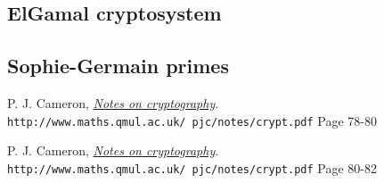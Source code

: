 \documentclass[12pt]{article}
\begin{document}
	
	
	
	\subsection*{ElGamal cryptosystem}
	
	
	\subsection*{Sophie-Germain primes}
		
	
	\newpage
	\begin{thebibliography}{99}
		
		P. J. Cameron, 
		\textit{\underline{Notes on cryptography}}.
		\\\texttt{http://www.maths.qmul.ac.uk/~pjc/notes/crypt.pdf}
		Page 78-80  
		
		P. J. Cameron, 
		\textit{\underline{Notes on cryptography}}.
		\\\texttt{http://www.maths.qmul.ac.uk/~pjc/notes/crypt.pdf}
		Page 80-82
		
	\end{thebibliography}
\end{document}
